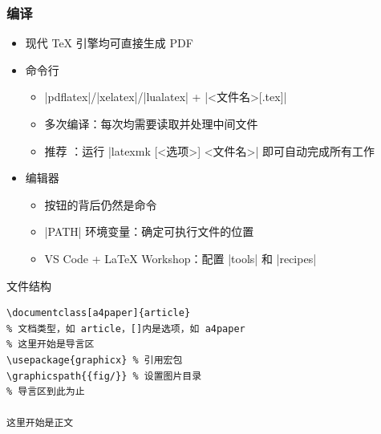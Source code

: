 \begin{frame}[fragile]
  \frametitle{编译}
  \begin{itemize}
    \item 现代 \TeX{} 引擎均可直接生成 PDF
    \item 命令行
  
      \begin{itemize}
        \item |pdflatex|/|xelatex|/|lualatex| + |<文件名>[.tex]|
        \item 多次编译：每次均需要读取并处理中间文件
        \item 推荐 ：运行 |latexmk [<选项>] <文件名>| 即可自动完成所有工作
      \end{itemize}
  
    \item 编辑器
  
      \begin{itemize}
        \item 按钮的背后仍然是命令
        \item |PATH| 环境变量：确定可执行文件的位置
        \item VS Code + \LaTeX{} Workshop：配置 |tools| 和 |recipes|
      \end{itemize}
  \end{itemize}
\end{frame}
  

\begin{frame}[fragile]{文件结构}
  \lstset{language=[LaTeX]TeX}
  \begin{lstlisting}[basicstyle=\ttfamily]
\documentclass[a4paper]{article}
% 文档类型，如 article，[]内是选项，如 a4paper
% 这里开始是导言区
\usepackage{graphicx} % 引用宏包
\graphicspath{{fig/}} % 设置图片目录
% 导言区到此为止

这里开始是正文

  \end{lstlisting}
\end{frame}

